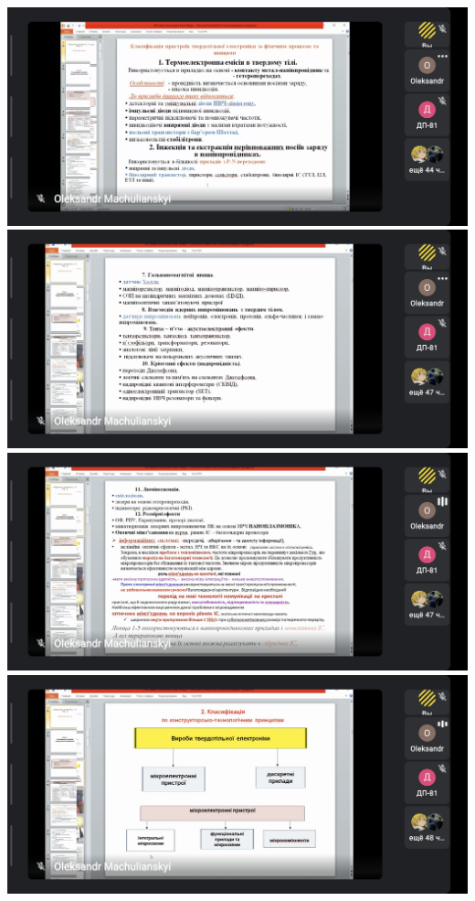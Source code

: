 \documentclass[a4paper,14pt]{extreport}
\begin{document}
\pagecolor{white}

\begin{center}
\includegraphics[scale = 0.3]{1.jpg}
\includegraphics[scale = 0.3]{2.jpg}
\includegraphics[scale = 0.3]{3.jpg}
\includegraphics[scale = 0.3]{4.jpg}

\end{center}
\end{document}
